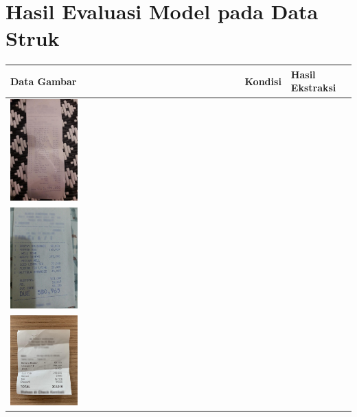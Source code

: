 \newpage

\section{Hasil Evaluasi Model pada Data Struk}

\begin{table}[htbp]
    \centering
    \begin{tabularx}{\textwidth}{|p{4.2cm}|X|X|}
        \hline
        \textbf{Data Gambar} & \textbf{Kondisi} & \textbf{Hasil Ekstraksi}\\ \hline
        \includegraphics[width=0.3\textwidth]{images/contoh-data/struk-1.jpg} & 
         & 
         \\ \hline
        \includegraphics[width=0.3\textwidth]{images/contoh-data/struk-2.jpg} & 
         & 
         \\ \hline
        \includegraphics[width=0.3\textwidth]{images/contoh-data/struk-3.jpg} & 
         & 
         \\ \hline
    \end{tabularx}
\end{table}

